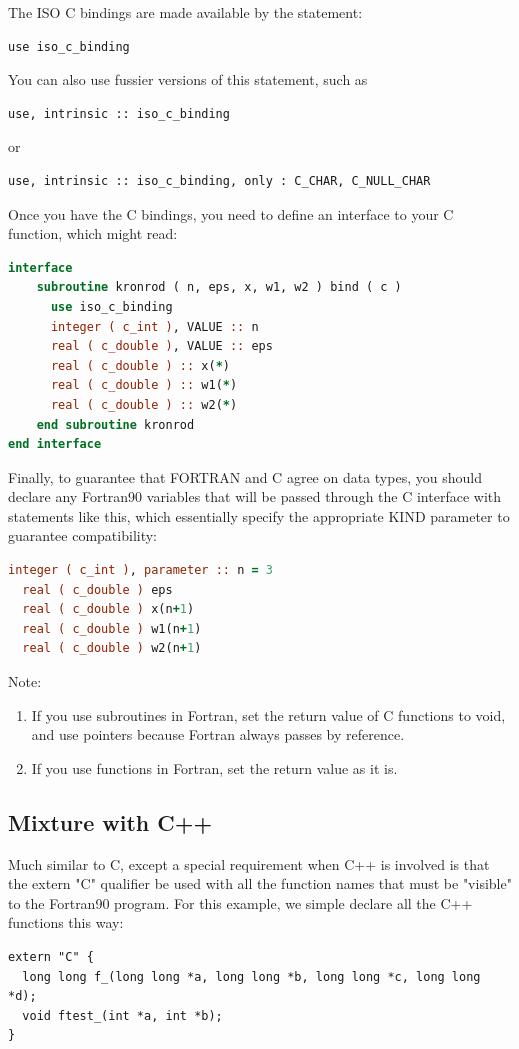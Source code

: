 \documentclass[11pt]{book} %
\begin{document}
The ISO C bindings are made available by the statement:
\begin{verbatim}
use iso_c_binding
\end{verbatim}

You can also use fussier versions of this statement, such as
\begin{verbatim}
use, intrinsic :: iso_c_binding
\end{verbatim}
or
\begin{verbatim}
use, intrinsic :: iso_c_binding, only : C_CHAR, C_NULL_CHAR
\end{verbatim}

Once you have the C bindings, you need to define an interface to your C function, which might read:
\begin{lstlisting}[language=Fortran, caption=C interface]
interface
    subroutine kronrod ( n, eps, x, w1, w2 ) bind ( c )
      use iso_c_binding
      integer ( c_int ), VALUE :: n
      real ( c_double ), VALUE :: eps
      real ( c_double ) :: x(*)
      real ( c_double ) :: w1(*)
      real ( c_double ) :: w2(*)
    end subroutine kronrod
end interface
\end{lstlisting}

Finally, to guarantee that FORTRAN and C agree on data types, you should declare any Fortran90 variables that will be passed through the C interface with statements like this, which essentially specify the appropriate KIND parameter to guarantee compatibility:
\begin{lstlisting}[language=Fortran, caption=C interface]
  integer ( c_int ), parameter :: n = 3
  real ( c_double ) eps
  real ( c_double ) x(n+1)
  real ( c_double ) w1(n+1)
  real ( c_double ) w2(n+1)
\end{lstlisting}

Note:
\begin{enumerate}
\item If you use subroutines in Fortran, set the return value of C functions to void, and use pointers because Fortran always passes by reference.
\item If you use functions in Fortran, set the return value as it is.
\end{enumerate}

\subsection{Mixture with C++}
Much similar to C, except a special requirement when C++ is involved is that the extern "C" qualifier be used with all the function names that must be "visible" to the Fortran90 program. For this example, we simple declare all the C++ functions this way:
\begin{verbatim}
extern "C" {
  long long f_(long long *a, long long *b, long long *c, long long *d);
  void ftest_(int *a, int *b);
}
\end{verbatim}
\end{document}
